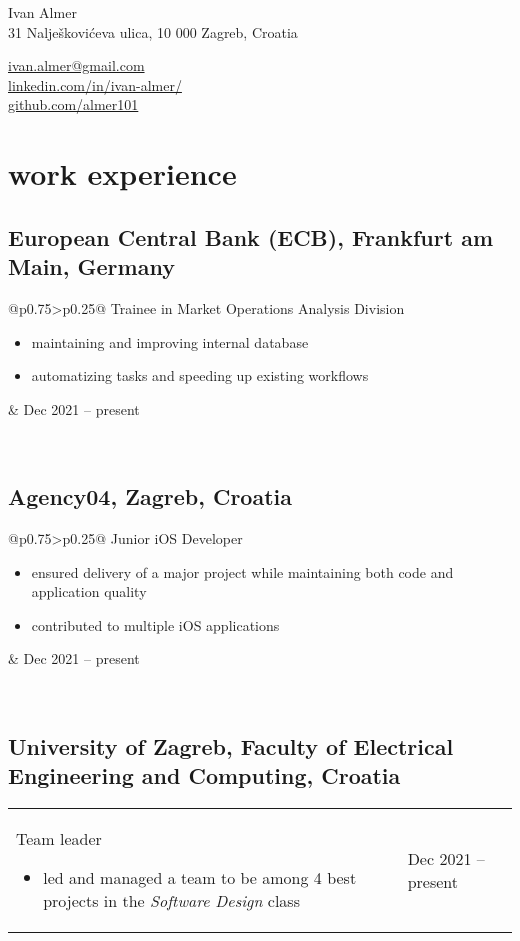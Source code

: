 \documentclass[a4paper]{article}
\makeatletter
\newlength{\tablewidth}
\newenvironment{period}[2]{%
\newcommand{\sarma}{#2}%
\setlength{\tablewidth}{\linewidth}
\addtolength{\tablewidth}{-2\tabcolsep}
\begin{tabular}{@{}p{0.75\tablewidth}>{\raggedleft\arraybackslash}p{0.25\tablewidth}@{}}%
#1 \newline
\begin{itemize}
}{%
\end{itemize} & \sarma \\%
\end{tabular}\\
}
\makeatother
\begin{document}
\fontfamily{\sfdefault}
\selectfont

\begin{minipage}{.5\textwidth}
\LARGE{Ivan Almer}\\
\normalsize{31 Nalješkovićeva ulica, 10 000 Zagreb, Croatia}
\end{minipage}%
\begin{minipage}{.5\textwidth}
\raggedleft
\href{mailto:ivan.almer@gmail.com}{ivan.almer@gmail.com} \\
\href{https://www.linkedin.com/in/ivan-almer/}{linkedin.com/in/ivan-almer/} \\
\href{https://github.com/almer101}{github.com/almer101} \\
\end{minipage}

\vspace{1em}

\section{work experience}
\subsection{European Central Bank (ECB), Frankfurt am Main, Germany}
\begin{period}{Trainee in Market Operations Analysis Division}{Dec 2021 -- present}
        \item
            maintaining and improving internal database
        \item 
            automatizing tasks and speeding up existing workflows
\end{period}

\subsection{Agency04, Zagreb, Croatia}
\begin{period}{Junior iOS Developer}{Jul 2018 -- Feb 2021}
    \item
        ensured delivery of a major project while maintaining both code and application quality
    \item
        contributed to multiple iOS applications
\end{period}

\subsection{University of Zagreb, Faculty of Electrical Engineering and Computing, Croatia}
\begin{period}{Team leader}{Sep 2018 -- Jan 2019}
    \item led and managed a team to be among 4 best projects in the \textit{Software Design} class
\end{period}
\end{document}
